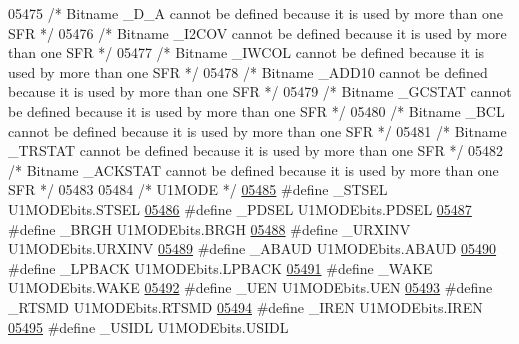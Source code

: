 \begin{DoxyCode}
05475 \textcolor{comment}{/* Bitname \_D\_A cannot be defined because it is used by more than one SFR */}
05476 \textcolor{comment}{/* Bitname \_I2COV cannot be defined because it is used by more than one SFR */}
05477 \textcolor{comment}{/* Bitname \_IWCOL cannot be defined because it is used by more than one SFR */}
05478 \textcolor{comment}{/* Bitname \_ADD10 cannot be defined because it is used by more than one SFR */}
05479 \textcolor{comment}{/* Bitname \_GCSTAT cannot be defined because it is used by more than one SFR */}
05480 \textcolor{comment}{/* Bitname \_BCL cannot be defined because it is used by more than one SFR */}
05481 \textcolor{comment}{/* Bitname \_TRSTAT cannot be defined because it is used by more than one SFR */}
05482 \textcolor{comment}{/* Bitname \_ACKSTAT cannot be defined because it is used by more than one SFR */}
05483 
05484 \textcolor{comment}{/* U1MODE */}
\hypertarget{a00015_source_l05485}{}\hyperlink{a00015_a9ac9ffcee603a43f9c730a156f7dbd60}{05485} \textcolor{preprocessor}{#define \_STSEL U1MODEbits.STSEL}
\hypertarget{a00015_source_l05486}{}\hyperlink{a00015_a50dcac1f83b325633625bc1afea81816}{05486} \textcolor{preprocessor}{#define \_PDSEL U1MODEbits.PDSEL}
\hypertarget{a00015_source_l05487}{}\hyperlink{a00015_aa83e7a45d9ffd4a51e37335b95d2ff24}{05487} \textcolor{preprocessor}{#define \_BRGH U1MODEbits.BRGH}
\hypertarget{a00015_source_l05488}{}\hyperlink{a00015_afaa661169d7fc80b6066b0470c105b58}{05488} \textcolor{preprocessor}{#define \_URXINV U1MODEbits.URXINV}
\hypertarget{a00015_source_l05489}{}\hyperlink{a00015_a097268313d8548f9d2843934f22e25fb}{05489} \textcolor{preprocessor}{#define \_ABAUD U1MODEbits.ABAUD}
\hypertarget{a00015_source_l05490}{}\hyperlink{a00015_a03fc8d04d03b261daa85dae274c19505}{05490} \textcolor{preprocessor}{#define \_LPBACK U1MODEbits.LPBACK}
\hypertarget{a00015_source_l05491}{}\hyperlink{a00015_a4b11d8f94ae8758b70734b145d917332}{05491} \textcolor{preprocessor}{#define \_WAKE U1MODEbits.WAKE}
\hypertarget{a00015_source_l05492}{}\hyperlink{a00015_ac7e1cfc0112c9ae053d92aba70190891}{05492} \textcolor{preprocessor}{#define \_UEN U1MODEbits.UEN}
\hypertarget{a00015_source_l05493}{}\hyperlink{a00015_aeabea4f8e9c9e6fed641b9a67a288ef9}{05493} \textcolor{preprocessor}{#define \_RTSMD U1MODEbits.RTSMD}
\hypertarget{a00015_source_l05494}{}\hyperlink{a00015_afa84616f7d2f6c37bea7273d5eb2347d}{05494} \textcolor{preprocessor}{#define \_IREN U1MODEbits.IREN}
\hypertarget{a00015_source_l05495}{}\hyperlink{a00015_a4b01ec21331629d7ac0330e2b4f305cc}{05495} \textcolor{preprocessor}{#define \_USIDL U1MODEbits.USIDL}

\end{DoxyCode}
